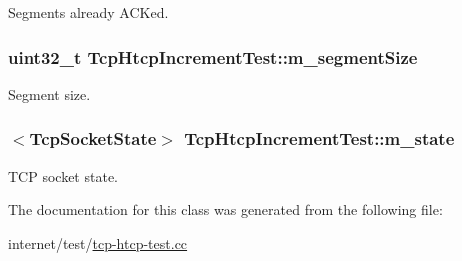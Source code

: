 Segments already A\+C\+Ked. 

\subsubsection[{\texorpdfstring{m\+\_\+segment\+Size}{m_segmentSize}}]{\setlength{\rightskip}{0pt plus 5cm}uint32\+\_\+t Tcp\+Htcp\+Increment\+Test\+::m\+\_\+segment\+Size\hspace{0.3cm}{\ttfamily [private]}}\hypertarget{classTcpHtcpIncrementTest_ad8ec2faf12b693a0cbddd454af54aa70}{}\label{classTcpHtcpIncrementTest_ad8ec2faf12b693a0cbddd454af54aa70}


Segment size. 

\subsubsection[{\texorpdfstring{m\+\_\+state}{m_state}}]{$<${\bf Tcp\+Socket\+State}$>$ Tcp\+Htcp\+Increment\+Test\+::m\+\_\+state\hspace{0.3cm}{\ttfamily [private]}}\hypertarget{classTcpHtcpIncrementTest_acdf9e9924087e9410acd0f0060dd3131}{}\label{classTcpHtcpIncrementTest_acdf9e9924087e9410acd0f0060dd3131}


T\+CP socket state. 



The documentation for this class was generated from the following file\+:\begin{DoxyCompactItemize}
\item 
internet/test/\hyperlink{tcp-htcp-test_8cc}{tcp-\/htcp-\/test.\+cc}\end{DoxyCompactItemize}
